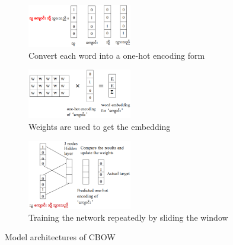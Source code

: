 \documentclass[conference]{IEEEtran}
\begin{document}
\begin{figure}
     \centering
     \begin{subfigure}[b]{0.5\textwidth}
         \centering
         \includegraphics[width=0.5\textwidth]{./fig/cbow-skip-a.png}
  	 \caption{Convert each word into a one-hot encoding form}
         \label{fig:cbowskipAfig}
     \end{subfigure}
     \hfill
     \begin{subfigure}[b]{0.5\textwidth}
         \centering
         \includegraphics[width=0.5\textwidth]{./fig/cbow-b.png}
 	 \caption{Weights are used to get the embedding} 
	 \label{fig:cbowBfig}
     \end{subfigure}
     \hfill
     \begin{subfigure}[b]{0.5\textwidth}
         \centering
         \includegraphics[width=0.5\textwidth]{./fig/cbow-c.png}
         \caption{Training the network repeatedly by sliding the window}
	 \label{fig:cbowCfig}
     \end{subfigure}
        \caption{Model architectures of CBOW}
        \label{fig:cbow}
\end{figure}
\end{document}
